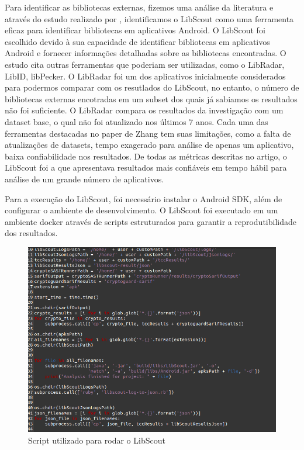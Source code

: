 Para identificar as bibliotecas externas, fizemos uma análise da literatura e através do estudo realizado por \cite{api_tpl_zhang}, identificamos o LibScout como uma ferramenta eficaz para identificar bibliotecas em aplicativos Android. O LibScout foi escolhido devido à sua capacidade de identificar bibliotecas em aplicativos Android e fornecer informações detalhadas sobre as bibliotecas encontradas. O estudo cita outras ferramentas que poderiam ser utilizadas, como o LibRadar, LibID, libPecker. O LibRadar foi um dos aplicativos inicialmente considerados para podermos comparar com os resutlados do LibScout, no entanto, o número de bibliotecas externas encotradas em um subset dos quais já sabiamos os resultados não foi suficiente. O LibRadar compara os resultados da investigação com um dataset base, o qual não foi atualizado nos últimos 7 anos. Cada uma das ferramentas destacadas no paper de Zhang tem suas limitações, como a falta de atualizações de datasets, tempo exagerado para análise de apenas um aplicativo, baixa confiabilidade nos resultados. De todas as métricas descritas no artigo, o LibScout foi a que apresentava resultados mais confiáveis em tempo hábil para análise de um grande número de aplicativos. 

Para a execução do LibScout, foi necessário instalar o Android SDK, além de configurar o ambiente de desenvolvimento. O LibScout foi executado em um ambiente docker através de scripts estruturados para garantir a reprodutibilidade dos resultados.

\begin{figure}[!ht]
  \centering
  \includegraphics[scale=0.4]{img/libscout_script.png}
  \caption{Script utilizado para rodar o LibScout}
  \label{img: libscout_script}
\end{figure}

